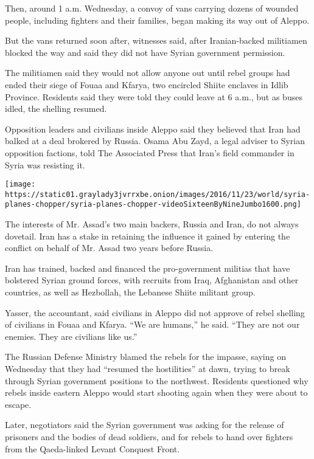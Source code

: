 Then, around 1 a.m. Wednesday, a convoy of vans carrying dozens of
wounded people, including fighters and their families, began making its
way out of Aleppo.

But the vans returned soon after, witnesses said, after Iranian-backed
militiamen blocked the way and said they did not have Syrian government
permission.

The militiamen said they would not allow anyone out until rebel groups
had ended their siege of Fouaa and Kfarya, two encircled Shiite enclaves
in Idlib Province. Residents said they were told they could leave at 6
a.m., but as buses idled, the shelling resumed.

Opposition leaders and civilians inside Aleppo said they believed that
Iran had balked at a deal brokered by Russia. Osama Abu Zayd, a legal
adviser to Syrian opposition factions, told The Associated Press that
Iran's field commander in Syria was resisting it.

\texttt{[image: https://static01.graylady3jvrrxbe.onion/images/2016/11/23/world/syria-planes-chopper/syria-planes-chopper-videoSixteenByNineJumbo1600.png]}

The interests of Mr. Assad's two main backers, Russia and Iran, do not
always dovetail. Iran has a stake in retaining the influence it gained
by entering the conflict on behalf of Mr. Assad two years before Russia.

Iran has trained, backed and financed the pro-government militias that
have bolstered Syrian ground forces, with recruits from Iraq,
Afghanistan and other countries, as well as Hezbollah, the Lebanese
Shiite militant group.

Yasser, the accountant, said civilians in Aleppo did not approve of
rebel shelling of civilians in Fouaa and Kfarya. ``We are humans,'' he
said. ``They are not our enemies. They are civilians like us.''

The Russian Defense Ministry blamed the rebels for the impasse, saying
on Wednesday that they had ``resumed the hostilities'' at dawn, trying
to break through Syrian government positions to the northwest. Residents
questioned why rebels inside eastern Aleppo would start shooting again
when they were about to escape.

Later, negotiators said the Syrian government was asking for the release
of prisoners and the bodies of dead soldiers, and for rebels to hand
over fighters from the Qaeda-linked Levant Conquest Front.

\href{https://www.nytimes3xbfgragh.onion/interactive/2016/06/10/world/middleeast/syria-road-trip.html}{}

